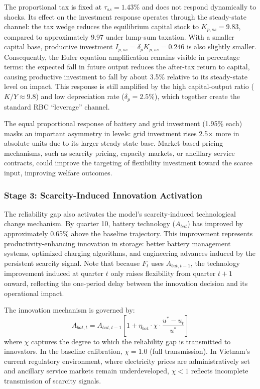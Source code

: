 \documentclass[12pt, a4paper]{article}
\begin{document}
	The proportional tax is fixed at $\tau_{ss} = 1.43\%$ and does not respond dynamically to shocks. Its effect on the investment response operates through the steady-state channel: the tax wedge reduces the equilibrium capital stock to $K_{p,ss} = 9.83$, compared to approximately 9.97 under lump-sum taxation. With a smaller capital base, productive investment $I_{p,ss} = \delta_p K_{p,ss} = 0.246$ is also slightly smaller. Consequently, the Euler equation amplification remains visible in percentage terms: the expected fall in future output reduces the after-tax return to capital, causing productive investment to fall by about 3.5\% relative to its steady-state level on impact. This response is still amplified by the high capital-output ratio ($K/Y \approx 9.8$) and low depreciation rate ($\delta_p = 2.5\%$), which together create the standard RBC ``leverage'' channel.
	
	The equal proportional response of battery and grid investment (1.95\% each) masks an important asymmetry in levels: grid investment rises 2.5$\times$ more in absolute units due to its larger steady-state base. Market-based pricing mechanisms, such as scarcity pricing, capacity markets, or ancillary service contracts, could improve the targeting of flexibility investment toward the scarce input, improving welfare outcomes.
	
	\subsubsection{Stage 3: Scarcity-Induced Innovation Activation}
	
	The reliability gap also activates the model's scarcity-induced technological change mechanism. By quarter 10, battery technology ($A_{bat}$) has improved by approximately 0.65\% above the baseline trajectory. This improvement represents productivity-enhancing innovation in storage: better battery management systems, optimized charging algorithms, and engineering advances induced by the persistent scarcity signal. Note that because $F_t$ uses $A_{bat,t-1}$, the technology improvement induced at quarter $t$ only raises flexibility from quarter $t+1$ onward, reflecting the one-period delay between the innovation decision and its operational impact.
	
	The innovation mechanism is governed by:
	\begin{equation}
		A_{bat,t} = A_{bat,t-1} \left[1 + \eta_{bat} \cdot \chi \cdot \frac{u^* - u_t}{u^*} \right]
	\end{equation}
	where $\chi$ captures the degree to which the reliability gap is transmitted to innovators. In the baseline calibration, $\chi = 1.0$ (full transmission). In Vietnam's current regulatory environment, where electricity prices are administratively set and ancillary service markets remain underdeveloped, $\chi < 1$ reflects incomplete transmission of scarcity signals.
	
\end{document}
